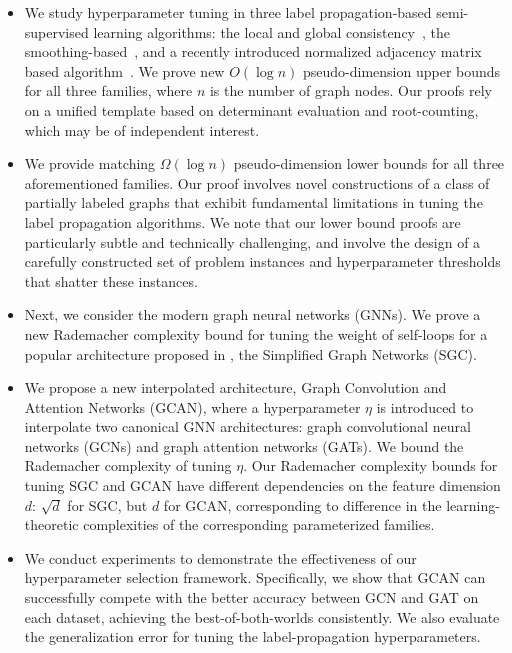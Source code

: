 \begin{itemize}[leftmargin=*]
    \item We study hyperparameter tuning in three  label propagation-based semi-supervised learning algorithms: the local and global consistency~\citep{zhou2003learning}, the smoothing-based~\citep{delalleau2005efficient}, and a recently introduced normalized adjacency matrix based algorithm~\citep{donnat2023studying}. We prove new $O\left(\log n\right)$ pseudo-dimension upper bounds for all three families, where $n$ is the number of graph nodes. Our proofs rely on a unified template based on determinant evaluation and root-counting, which may be of independent interest.
    \item We provide matching $\Omega\left(\log n\right)$ pseudo-dimension lower bounds for all three aforementioned families. Our proof involves novel constructions of a class of partially labeled graphs that exhibit fundamental limitations in tuning the label propagation algorithms. We note that our lower bound proofs are particularly subtle and technically challenging, and involve the design of a carefully constructed set of problem instances and hyperparameter thresholds that shatter these instances.
    \item Next, we consider the modern graph neural networks (GNNs). We prove a new Rademacher complexity bound for tuning the weight of self-loops for a popular architecture proposed in \cite{wu19simplifying}, the Simplified Graph Networks (SGC). 
    \item We propose a new interpolated architecture, Graph Convolution and Attention Networks (GCAN), where a hyperparameter $\eta$ is introduced to interpolate two canonical GNN architectures: graph convolutional neural networks (GCNs) and graph attention  networks (GATs). We bound the Rademacher complexity of tuning $\eta$. %
    Our Rademacher complexity bounds for tuning SGC and GCAN have different dependencies on the feature dimension $d$: $\sqrt{d}$ for SGC, but $d$ for GCAN, corresponding to difference in the learning-theoretic complexities of the corresponding parameterized families.
    \item We conduct experiments to demonstrate the effectiveness of our hyperparameter selection framework. Specifically, we show that GCAN can successfully compete with the better accuracy between GCN and GAT on each dataset, achieving the best-of-both-worlds consistently. We also evaluate the generalization error for tuning the  label-propagation hyperparameters.
\end{itemize}

